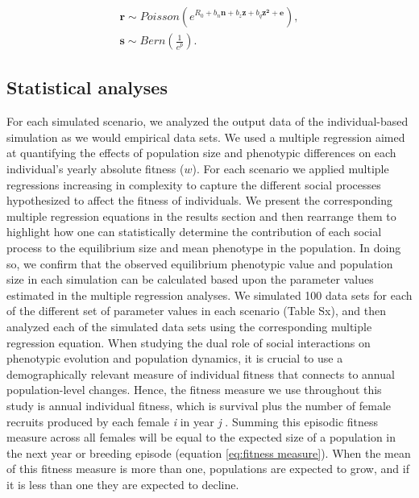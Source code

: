 \documentclass{article}
\begin{document}
\begin{subequations} 
\begin{gather}
\mathbf{r}\sim Poisson(e^{R_{0} + b_{n} \mathbf{n} + b_{z} \mathbf{z} + b_{q} \mathbf{z^2} + \mathbf{e}}), \label{eq:Full1a} \\
\mathbf{s}\sim Bern(\frac{1}{e^{\bar{p}}}). \label{eq:Full1b}
\end{gather}
\end{subequations}

\subsection{Statistical analyses}

For each simulated scenario, we analyzed the output data of the individual-based simulation as we would empirical data sets. We used a multiple regression aimed at quantifying the effects of population size and phenotypic differences on each individual's yearly absolute fitness ($w$). For each scenario we applied multiple regressions increasing in complexity to capture the different social processes hypothesized to affect the fitness of individuals. We present the corresponding multiple regression equations in the results section and then rearrange them to highlight how one can statistically determine the contribution of each social process to the equilibrium size and mean phenotype in the population. In doing so, we confirm that the observed equilibrium phenotypic value and population size in each simulation can be calculated based upon the parameter values estimated in the multiple regression analyses. We simulated 100 data sets for each of the different set of parameter values in each scenario (Table Sx), and then analyzed each of the simulated data sets using the corresponding multiple regression equation. When studying the dual role of social interactions on phenotypic evolution and population dynamics, it is crucial to use a demographically relevant measure of individual fitness that connects to annual population-level changes. Hence, the fitness measure we use throughout this study is annual individual fitness, which is survival plus the number of female recruits produced by each female \textit{i} in year \textit{j} \citep{Saether2015}. Summing this episodic fitness measure across all females will be equal to the expected size of a population in the next year or breeding episode (equation  \ref{eq:fitness measure}). When the mean of this fitness measure is more than one, populations are expected to grow, and if it is less than one they are expected to decline. 
\end{document}
